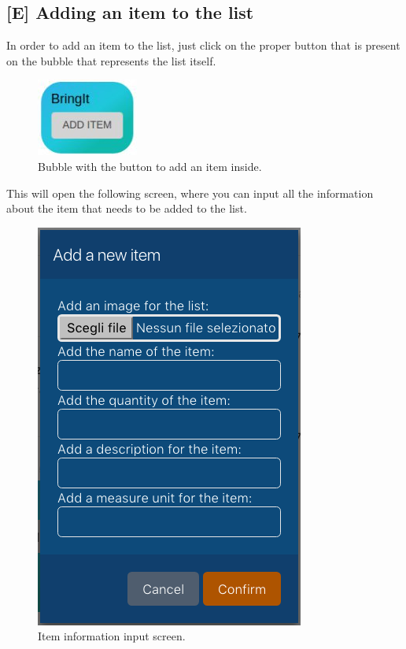 \newpage
\subsection{[E] Adding an item to the list}
In order to add an item to the list, just click on the proper button that is present on the bubble that represents the list itself.

\begin{figure}[H]
  \centering 
  \includegraphics[scale=1.0]{Sections/3-HowToUse/Images/bubble.png}
  \caption{Bubble with the button to add an item inside.}
\end{figure}

This will open the following screen, where you can input all the information about the item that needs to be added to the list. \\

\begin{figure}[H]
  \centering 
  \includegraphics[scale=0.5]{Sections/3-HowToUse/Images/item_add.png}
  \caption{Item information input screen.}
\end{figure}

